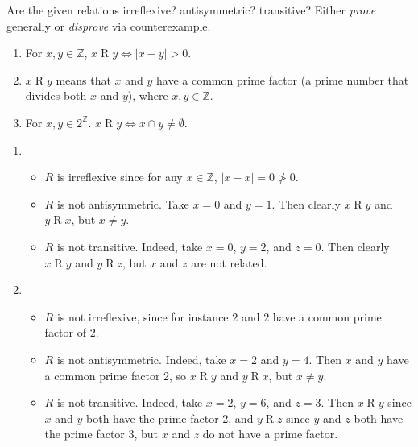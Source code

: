 \documentclass{article}
\newcommand{\Z}{\mathbb{Z}}
\theoremstyle{definition}
\begin{document}
\begin{question}{9}
    Are the given relations irreflexive? antisymmetric? transitive? Either \textit{prove} generally or \textit{disprove} via 
    counterexample.
    	\begin{enumerate}
	\item For $x, y \in \Z$,  $x\mathrel{R}y \iff |x - y| > 0$. 
	\item  $x\mathrel{R}y$ means that $x$ and $y$ have a common prime factor (a prime number that divides both $x$ and $y$), 
	where $x, y \in \Z$.
	\item For $x, y \in 2^{\Z}$. $x\mathrel{R}y \iff x \cap y \neq \emptyset$.
	\end{enumerate}
\end{question}
\begin{solution}
\begin{enumerate}
	\item
\begin{itemize}
		\item $ R$ is irreflexive since for any $x \in \Z$, $|x-x|  = 0 \not > 0$.
		\item $ R$ is not antisymmetric. Take $x = 0$ and $y = 1$. Then clearly $x \mathrel{R}y$ and $y \mathrel{R}x$, but $x \neq y$.
		\item $ R$ is not transitive. Indeed, take $x = 0$, $y = 2$, and $z = 0$. Then clearly $x \mathrel{R}y$ and $y \mathrel{R}z$, but $x$ and $z$ are not related.
	\end{itemize}
	
	\item 
	\begin{itemize}
		\item $ R$ is not irreflexive, since for instance $2$ and $2$ have a common prime factor of $2$.
		\item $ R$ is not antisymmetric. Indeed, take $x = 2$ and $y = 4$. Then $x$ and $y$ have a common prime factor 2, so $x \mathrel{R}y$ and $y \mathrel{R}x$, but $x \neq y$.
		\item $ R$ is not transitive. Indeed, take $x = 2$, $y = 6$, and $z = 3$. Then $x \mathrel{R}y$ since $x$ and $y$ both have the prime factor 2, and $y \mathrel{R}z$ since $y$ and $z$ both have the prime factor 3, but $x$ and $z$ do not have a prime factor.
	\end{itemize}
	

\end{enumerate}
\end{solution}
\end{document}

